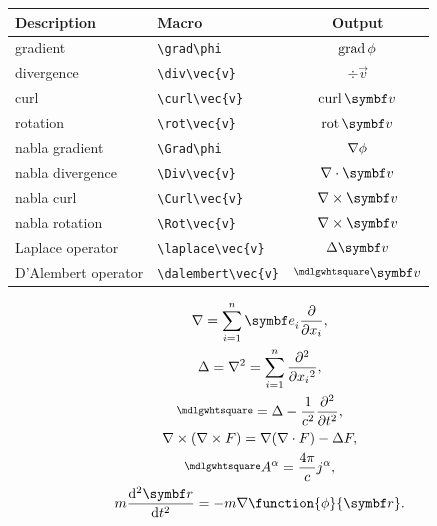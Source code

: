 \documentclass[DIV=13]{scrartcl}
\begin{document}
\begin{center}
  \begin{tabular}{llc}
    \toprule
    \textbf{Description} & \textbf{Macro}           & \textbf{Output}     \\
    \midrule
    gradient             & \verb|\grad\phi|         & $\operatorname{grad}\phi$         \\
    divergence           & \verb|\div\vec{v}|       & $\div\vec{v}$       \\
    curl                 & \verb|\curl\vec{v}|      & $\curl\vec{v}$      \\
    rotation             & \verb|\rot\vec{v}|       & $\rot\vec{v}$       \\
    \midrule
    nabla gradient       & \verb|\Grad\phi|         & $\nabla\phi$         \\
    nabla divergence     & \verb|\Div\vec{v}|       & $\Div\vec{v}$       \\
    nabla curl           & \verb|\Curl\vec{v}|      & $\Curl\vec{v}$      \\
    nabla rotation       & \verb|\Rot\vec{v}|       & $\Rot\vec{v}$       \\
    \midrule
    Laplace operator     & \verb|\laplace\vec{v}|   & $\laplace\vec{v}$   \\
    D'Alembert operator  & \verb|\dalembert\vec{v}| & $\dalembert\vec{v}$ \\
    \bottomrule
  \end{tabular}
\end{center}

\begin{gather}
  \nabla = \sum_{i=1}^n \vec{e}_i\pdd{}{x_i}, \\
  \laplace = \nabla^2 = \sum_{i=1}^n \pdd[2]{}{x_i}, \\
  \dalembert = \laplace - \frac{1}{c^2}\pdd[2]{}{t}, \\
  \Rot(\Rot F) = \Grad(\Div F) - \laplace F, \\
  \dalembert A^\alpha = \frac{4\pi}{c} j^\alpha, \\
  m\dd[2]{\vec{r}}{t} = -m\Grad\function{\phi}{\vec{r}}.
\end{gather}
\end{document}
